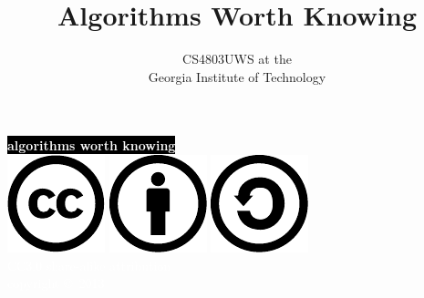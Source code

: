 \documentclass[mathserif,xcolor={dvipsnames,table}]{beamer}
\title{\textbf{Algorithms Worth Knowing}}
\date{}
\author{CS4803UWS at the\\
Georgia Institute of Technology
}
\begin{document}
{
%
\begin{frame}[plain]
\textcolor{white}{
%
\colorbox{black}{\textbf{algorithms worth knowing}}
}
\vspace{2.7in}
\\
\hfill\includegraphics[scale=.25]{images/cc-logo.pdf}
\includegraphics[scale=.25]{images/cc-new.pdf}
\includegraphics[scale=.25]{images/cc-share.pdf}
\textcolor{white}{
\\
\hfill \tiny{CC3.0 share-alike attribution}\\
}
\textcolor{white}{
\hfill \scriptsize{copyright \copyright\ 2013}\\
}
\end{frame}
}
\end{document}
